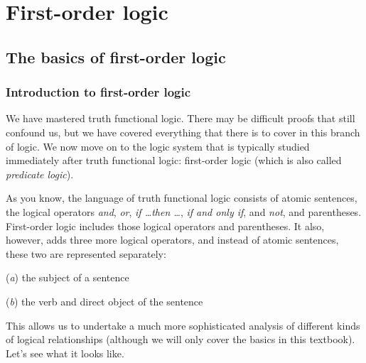 \graphicspath{{figures--proofs/}}
\part{First-order logic}
\label{ch.FOL}

\chapter{The basics of first-order logic}\label{FOL-basics}

\section{Introduction to first-order logic}

We have mastered truth functional logic. There may be difficult proofs that still confound us, but we have covered everything that there is to cover in this branch of logic. We now move on to the logic system that is typically studied immediately after truth functional logic: first-order logic (which is also called \textit{predicate logic}). 

As you know, the language of truth functional logic consists of atomic sentences, the logical operators \textit{and}, \textit{or}, \textit{if \ldots then \ldots}, \textit{if and only if}, and \textit{not}, and parentheses. First-order logic includes those logical operators and parentheses. It also, however, adds three more logical operators, and instead of atomic sentences, these two are represented separately: 
\begin{ebullet}
\item[(\textit{a})] the subject of a sentence
\item[(\textit{b})] the verb and direct object of the sentence
\end{ebullet}
This allows us to undertake a much more sophisticated analysis of different kinds of logical relationships (although we will only cover the basics in this textbook). Let's see what it looks like.


